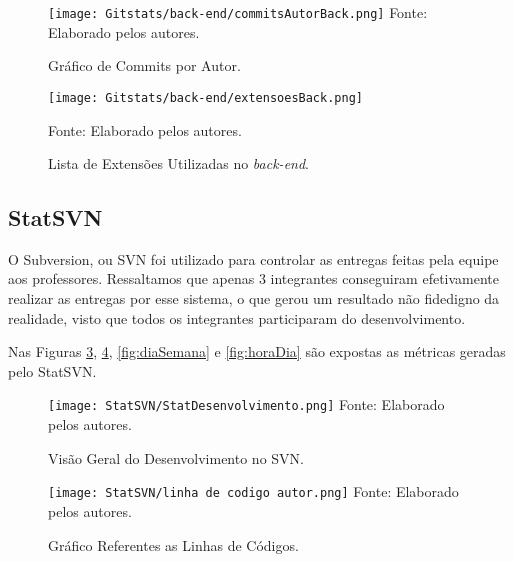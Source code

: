 \documentclass[
    12pt,               %
    openright,          %
    oneside,
    a4paper,            %
    BIBLATEX,           %
    TODO,               %
    english,            %
    brazil              %
    ]{ifsp-spo-inf-ctds}
\begin{document}
            \begin{figure}[H]
                \centering
                \caption{Gráfico de Commits por Autor.}
                \texttt{[image: Gitstats/back-end/commitsAutorBack.png]}
                {\footnotesize Fonte: Elaborado pelos autores.}
                \label{fig:commitBack}
            \end{figure}    

            \begin{figure}[H]
                \centering
                \caption{Lista de Extensões Utilizadas no \emph{back-end}.}
                \texttt{[image: Gitstats/back-end/extensoesBack.png]}
                
                {\footnotesize Fonte: Elaborado pelos autores.}
                \label{fig:extensoesBack}
            \end{figure}  


    \subsection{StatSVN}

        O Subversion, ou SVN foi utilizado para controlar as entregas feitas pela equipe aos professores. Ressaltamos que apenas 3 integrantes conseguiram efetivamente realizar as entregas por esse sistema, o que gerou um resultado não fidedigno da realidade, visto que todos os integrantes participaram do desenvolvimento. 
    
        Nas Figuras \ref{fig:desenvolvimentoSVN}, \ref{fig:linhaCod}, \ref{fig:diaSemana} e \ref{fig:horaDia} são expostas as métricas geradas pelo StatSVN.

    \begin{figure}[H]
                \centering
                \caption{Visão Geral do Desenvolvimento no SVN.}
                \texttt{[image: StatSVN/StatDesenvolvimento.png]}
                {\footnotesize Fonte: Elaborado pelos autores.}
                \label{fig:desenvolvimentoSVN}
            \end{figure}
    
    \begin{figure}[H]
                \centering
                \caption{Gráfico Referentes as Linhas de Códigos.}
                \texttt{[image: StatSVN/linha de codigo autor.png]}
                {\footnotesize Fonte: Elaborado pelos autores.}
                \label{fig:linhaCod}
            \end{figure}
    
\end{document}
